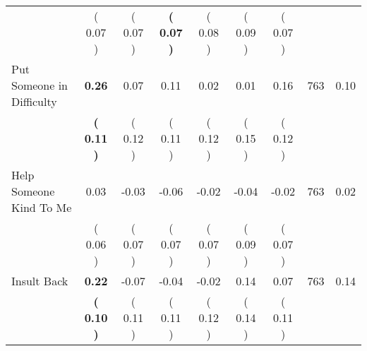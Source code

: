 \begin{tabular}{lcccccccc}
 & (     0.07 ) & (     0.07 ) & \textbf{(     0.07 )} & (     0.08 ) & (     0.09 ) & (     0.07 ) & \\
Put Someone in Difficulty & \textbf{     0.26} &      0.07 &      0.11 &      0.02 &      0.01 &      0.16 & 763 &       0.10 \\ 
 & \textbf{(     0.11 )} & (     0.12 ) & (     0.11 ) & (     0.12 ) & (     0.15 ) & (     0.12 ) & \\
Help Someone Kind To Me &      0.03 &     -0.03 &     -0.06 &     -0.02 &     -0.04 &     -0.02 & 763 &       0.02 \\ 
 & (     0.06 ) & (     0.07 ) & (     0.07 ) & (     0.07 ) & (     0.09 ) & (     0.07 ) & \\
Insult Back & \textbf{     0.22} &     -0.07 &     -0.04 &     -0.02 &      0.14 &      0.07 & 763 &       0.14 \\ 
 & \textbf{(     0.10 )} & (     0.11 ) & (     0.11 ) & (     0.12 ) & (     0.14 ) & (     0.11 ) & \\
\bottomrule
\end{tabular}
